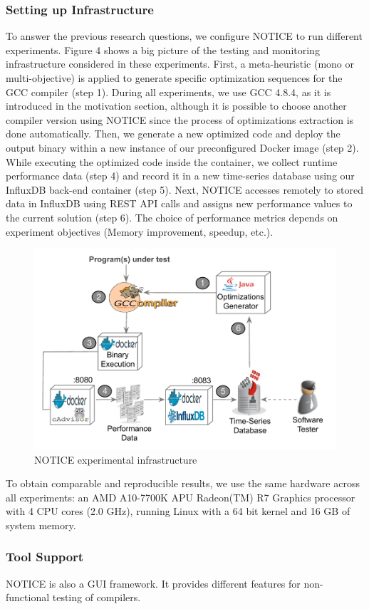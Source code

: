 \subsubsection{Setting up Infrastructure}
To answer the previous research questions, we configure NOTICE to run different experiments. Figure 4 shows a big picture of the testing and monitoring infrastructure considered in these experiments. 
First, a meta-heuristic (mono or multi-objective) is applied to generate specific optimization sequences for the GCC compiler (step 1). During all experiments, we use GCC 4.8.4, as it is introduced in the motivation section, although it is possible to choose another compiler version using NOTICE since the process of optimizations extraction is done automatically. 
Then, we generate a new optimized code and deploy the output binary within a new instance of our preconfigured Docker image (step 2). While executing the optimized code inside the container, we collect runtime performance data (step 4) and record it in a new time-series database using our InfluxDB back-end container (step 5). Next, NOTICE accesses remotely to stored data in InfluxDB using REST API calls and assigns new performance values to the current solution (step 6). The choice of performance metrics depends on experiment objectives (Memory improvement, speedup, etc.).
\begin{figure}[h]
	\centering
	\includegraphics[width=0.8\linewidth]{chapitre3/fig/infraup.pdf}
	\caption{NOTICE experimental infrastructure}
\end{figure}

To obtain comparable and reproducible results, we use the same hardware across all experiments: an AMD A10-7700K APU Radeon(TM) R7 Graphics processor with 4 CPU cores (2.0 GHz), running Linux with a 64 bit kernel and 16 GB of system memory.

\subsubsection{Tool Support}		
NOTICE is also a GUI framework. It provides different features for non-functional testing of compilers.

